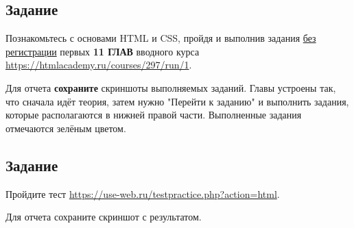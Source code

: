 \documentclass[a4paper,12pt]{extarticle}
\begin{document}
\subsection{Задание}
Познакомьтесь с основами HTML и CSS, пройдя и выполнив задания \underline{без регистрации} первых \textbf{11 ГЛАВ} вводного курса \url{https://htmlacademy.ru/courses/297/run/1}.

Для отчета \textbf{сохраните} скриншоты выполняемых заданий. Главы устроены так, что сначала идёт теория, затем нужно "Перейти к заданию" и выполнить задания, которые располагаются в нижней правой части. Выполненные задания отмечаются \textcolor{mygreen}{зелёным цветом}.

\subsection{Задание}
Пройдите тест \url{https://use-web.ru/testpractice.php?action=html}.

Для отчета сохраните скриншот с результатом.
\end{document}
